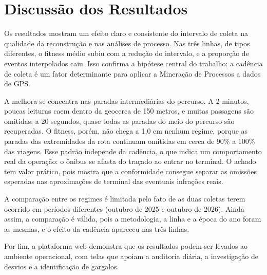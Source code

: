 \section{Discussão dos Resultados}\label{sec:discussao}

Os resultados mostram um efeito claro e consistente do intervalo de coleta na qualidade da reconstrução e nas análises de processo. Nas três linhas, de tipos diferentes, o fitness médio subiu com a redução do intervalo, e a proporção de eventos interpolados caiu. Isso confirma a hipótese central do trabalho: a cadência de coleta é um fator determinante para aplicar a Mineração de Processos a dados de GPS.

A melhora se concentra nas paradas intermediárias do percurso. A 2 minutos, poucas leituras caem dentro da geocerca de 150 metros, e muitas passagens são omitidas; a 20 segundos, quase todas as paradas do meio do percurso são recuperadas. O fitness, porém, não chega a 1,0 em nenhum regime, porque as paradas das extremidades da rota continuam omitidas em cerca de 90\% a 100\% das viagens. Esse padrão independe da cadência, o que indica um comportamento real da operação: o ônibus se afasta do traçado ao entrar no terminal. O achado tem valor prático, pois mostra que a conformidade consegue separar as omissões esperadas nas aproximações de terminal das eventuais infrações reais.

A comparação entre os regimes é limitada pelo fato de as duas coletas terem ocorrido em períodos diferentes (outubro de 2025 e outubro de 2026). Ainda assim, a comparação é válida, pois a metodologia, a linha e a época do ano foram as mesmas, e o efeito da cadência apareceu nas três linhas.

Por fim, a plataforma web demonstra que os resultados podem ser levados ao ambiente operacional, com telas que apoiam a auditoria diária, a investigação de desvios e a identificação de gargalos.
